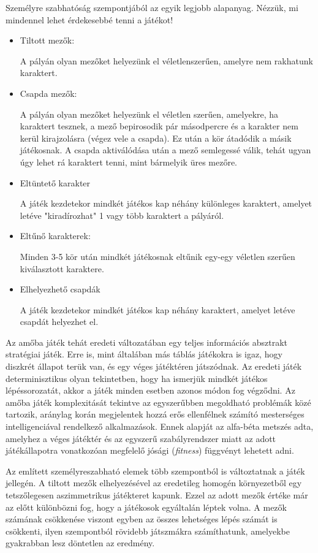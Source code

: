 Személyre szabhatóság szempontjából az egyik legjobb alapanyag. Nézzük, mi mindennel lehet érdekesebbé tenni a játékot!
\begin{itemize}
	
	\item Tiltott mezők:
	
	A pályán olyan mezőket helyezünk el véletlenszerűen, amelyre nem rakhatunk karaktert.
	\item Csapda mezők:
	
	A pályán olyan mezőket helyezünk el véletlen szerűen, amelyekre, ha karaktert tesznek, a mező bepirosodik pár másodpercre és a karakter nem kerül kirajzolásra (végez vele a csapda). Ez után a kör átadódik a másik játékosnak. A csapda aktiválódása után a mező semlegessé válik, tehát ugyan úgy lehet rá karaktert tenni, mint bármelyik üres mezőre.
	\item Eltüntető karakter
	
	A játék kezdetekor mindkét játékos kap néhány különleges karaktert, amelyet letéve "kiradírozhat" 1 vagy több karaktert a pályáról.
	\item Eltűnő karakterek:
	
	Minden 3-5 kör után mindkét játékosnak eltűnik egy-egy véletlen szerűen kiválasztott karaktere.	
	\item Elhelyezhető csapdák
	
	A játék kezdetekor mindkét játékos kap néhány karaktert, amelyet letéve csapdát helyezhet el.	
\end{itemize}

Az amőba játék tehát eredeti változatában egy teljes információs absztrakt stratégiai játék. Erre is, mint általában más táblás játékokra is igaz, hogy diszkrét állapot terük van, és egy véges játéktéren játszódnak. Az eredeti játék determinisztikus olyan tekintetben, hogy ha ismerjük mindkét játékos lépéssorozatát, akkor a játék minden esetben azonos módon fog végződni. Az amőba játék komplexitását tekintve az egyszerűbben megoldható problémák közé tartozik, aránylag korán megjelentek hozzá erős ellenfélnek számító mesterséges intelligenciával rendelkező alkalmazások. Ennek alapját az alfa-béta metszés adta, amelyhez a véges játéktér és az egyszerű szabályrendszer miatt az adott játékállapotra vonatkozóan megfelelő jósági (\textit{fitness}) függvényt lehetett adni.

Az említett személyreszabható elemek több szempontból is változtatnak a játék jellegén. A tiltott mezők elhelyezésével az eredetileg homogén környezetből egy tetszőlegesen aszimmetrikus játékteret kapunk. Ezzel az adott mezők értéke már az előtt különbözni fog, hogy a játékosok egyáltalán léptek volna. A mezők számának csökkenése viszont egyben az összes lehetséges lépés számát is csökkenti, ilyen szempontból rövidebb játszmákra számíthatunk, amelyekbe gyakrabban lesz döntetlen az eredmény.

